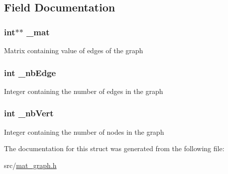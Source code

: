 \subsection{Field Documentation}
\hypertarget{struct_mat_graph_ae026787d2e6fdf8dfd382462fea13cd4}{
\subsubsection[{\-\_\-mat}]{\setlength{\rightskip}{0pt plus 5cm}int$\ast$$\ast$ {\bf \-\_\-mat}}}\label{struct_mat_graph_ae026787d2e6fdf8dfd382462fea13cd4}
Matrix containing value of edges of the graph \hypertarget{struct_mat_graph_a69fef280661aff966495a7c668e73284}{
\subsubsection[{\-\_\-nb\-Edge}]{\setlength{\rightskip}{0pt plus 5cm}int {\bf \-\_\-nb\-Edge}}}\label{struct_mat_graph_a69fef280661aff966495a7c668e73284}
Integer containing the number of edges in the graph \hypertarget{struct_mat_graph_a3da3524d8a5c0b61107c4d25f8d23832}{
\subsubsection[{\-\_\-nb\-Vert}]{\setlength{\rightskip}{0pt plus 5cm}int {\bf \-\_\-nb\-Vert}}}\label{struct_mat_graph_a3da3524d8a5c0b61107c4d25f8d23832}
Integer containing the number of nodes in the graph 

The documentation for this struct was generated from the following file\-:\begin{DoxyCompactItemize}
\item 
src/\hyperlink{mat__graph_8h}{mat\-\_\-graph.\-h}\end{DoxyCompactItemize}

